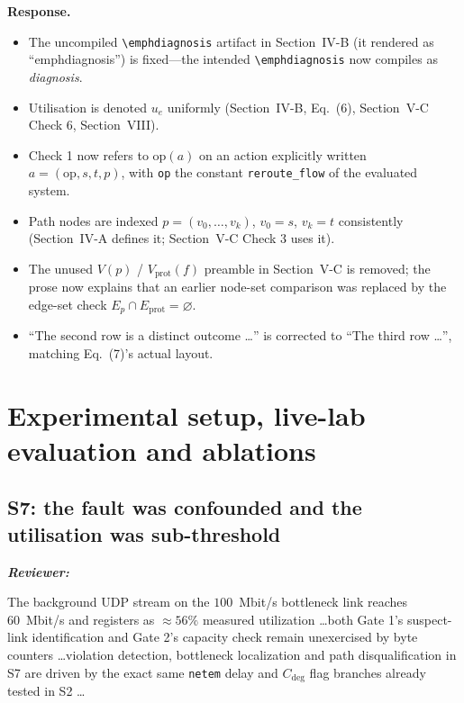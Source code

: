 \documentclass[11pt,a4paper]{article}
\newenvironment{reviewer}{\par\medskip\noindent\begin{minipage}{\linewidth}\small\itshape\color{quote}\textbf{Reviewer:}\par}{\end{minipage}\medskip\par}
\newenvironment{response}{\par\noindent\begin{minipage}{\linewidth}\small\textbf{Response.}\par}{\end{minipage}\medskip\par}
\begin{document}
\begin{response}
\begin{itemize}
  \item The uncompiled \texttt{\textbackslash emphdiagnosis} artifact in
    Section~IV-B (it rendered as ``emphdiagnosis'') is fixed---the intended
    \texttt{\textbackslash emph{diagnosis}} now compiles as
    \emph{diagnosis}.
  \item Utilisation is denoted $u_e$ uniformly (Section~IV-B, Eq.~(6),
    Section~V-C Check 6, Section~VIII).
  \item Check 1 now refers to $\mathrm{op}(a)$ on an action explicitly
    written $a=(\mathrm{op}, s, t, p)$, with \texttt{op} the constant
    \texttt{reroute\_flow} of the evaluated system.
  \item Path nodes are indexed $p = (v_0, \dots, v_k)$, $v_0 = s$,
    $v_k = t$ consistently (Section~IV-A defines it; Section~V-C Check 3
    uses it).
  \item The unused $V(p)$ / $V_{\mathrm{prot}}(f)$ preamble in Section~V-C is
    removed; the prose now explains that an earlier node-set comparison was
    replaced by the edge-set check $E_p \cap E_{\mathrm{prot}} =
    \varnothing$.
  \item ``The second row is a distinct outcome \dots'' is corrected to
    ``The third row \dots'', matching Eq.~(7)'s actual layout.
\end{itemize}
\end{response}

\section{Experimental setup, live-lab evaluation and ablations}

\subsection{S7: the fault was confounded and the utilisation was
sub-threshold}

\begin{reviewer}
The background UDP stream on the $100$~Mbit/s bottleneck link reaches
60~Mbit/s and registers as $\approx 56\%$ measured utilization \dots both
Gate 1's suspect-link identification and Gate 2's capacity check remain
unexercised by byte counters \dots violation detection, bottleneck
localization and path disqualification in S7 are driven by the exact same
\texttt{netem} delay and $C_{\mathrm{deg}}$ flag branches already tested in
S2 \dots
\end{reviewer}
\end{document}
